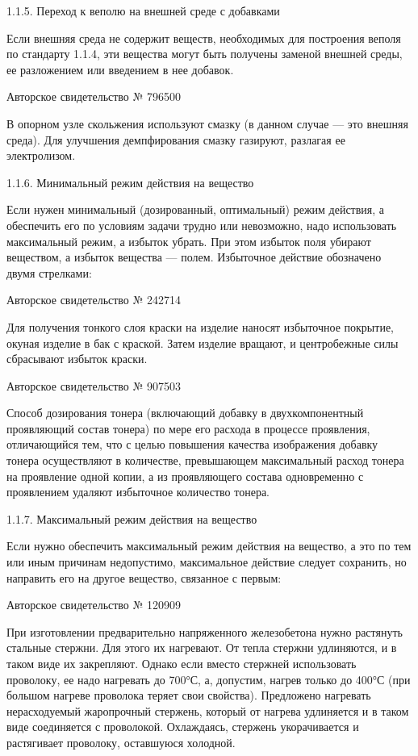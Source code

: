1.1.5. Переход к веполю на внешней среде с добавками

Если  внешняя среда  не содержит  веществ, необходимых  для построения
веполя по  стандарту 1.1.4, эти  вещества могут быть  получены заменой
внешней среды, ее разложением или введением в нее добавок.

Авторское свидетельство № 796500

В опорном  узле скольжения  используют смазку (в  данном случае  — это
внешняя среда). Для улучшения  демпфирования смазку газируют, разлагая
ее электролизом.

1.1.6. Минимальный режим действия на вещество

Если  нужен минимальный  (дозированный,  оптимальный) режим  действия,
а  обеспечить  его по  условиям  задачи  трудно или  невозможно,  надо
использовать максимальный  режим, а  избыток убрать. При  этом избыток
поля  убирают  веществом,  а  избыток  вещества  —  полем.  Избыточное
действие обозначено двумя стрелками:


Авторское свидетельство № 242714

Для  получения  тонкого  слоя  краски на  изделие  наносят  избыточное
покрытие, окуная  изделие в  бак с краской.  Затем изделие  вращают, и
центробежные силы сбрасывают избыток краски.

Авторское свидетельство № 907503

Способ  дозирования  тонера  (включающий  добавку  в  двухкомпонентный
проявляющий состав тонера) по мере  его расхода в процессе проявления,
отличающийся тем,  что с целью повышения  качества изображения добавку
тонера  осуществляют  в  количестве, превышающем  максимальный  расход
тонера  на   проявление  одной   копии,  а  из   проявляющего  состава
одновременно с проявлением удаляют избыточное количество тонера.


1.1.7. Максимальный режим действия на вещество

Если нужно обеспечить  максимальный режим действия на  вещество, а это
по тем  или иным  причинам недопустимо, максимальное  действие следует
сохранить, но направить его на другое вещество, связанное с первым:


Авторское свидетельство № 120909

При  изготовлении   предварительно  напряженного   железобетона  нужно
растянуть стальные стержни.  Для этого их нагревают.  От тепла стержни
удлиняются, и в таком виде  их закрепляют. Однако если вместо стержней
использовать  проволоку,  ее надо  нагревать  до  700°С, а,  допустим,
нагрев  только до  400°С (при  большом нагреве  проволока теряет  свои
свойства).  Предложено нагревать  нерасходуемый жаропрочный  стержень,
который от нагрева удлиняется и в таком виде соединяется с проволокой.
Охлаждаясь, стержень укорачивается и растягивает проволоку, оставшуюся
холодной.


